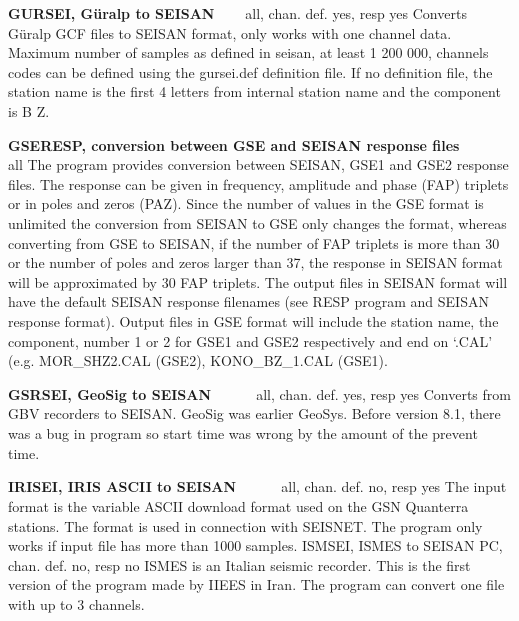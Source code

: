 \textbf{GURSEI, G\"uralp to SEISAN} \verb|   | all, chan. def. yes, resp yes\newline
Converts G\"uralp GCF files to SEISAN format, only works with one channel data. Maximum number of samples as defined in seisan, at least 1 200 000, channels codes can be defined using the gursei.def 
definition file. If no definition file, the station name is the first 4 letters from internal station name and the component is B Z. 

\textbf{GSERESP, conversion between GSE and SEISAN response files} \verb|     | all \newline
The program provides conversion between SEISAN, GSE1 and GSE2 response files. The response can be given in frequency, amplitude and phase (FAP) triplets or in poles and zeros (PAZ). Since the number of values in the GSE format is unlimited the conversion from SEISAN to GSE only changes the format, whereas converting from GSE to SEISAN, if the number of FAP triplets is more than 30 or the number of poles and zeros larger than 37, the response in SEISAN format will be approximated by 30 FAP triplets. The output files in SEISAN format will have the default SEISAN response filenames (see RESP program and SEISAN response format). Output files in GSE format will include the station name, the component, number 1 or 2 for GSE1 and GSE2 respectively and end on `.CAL' (e.g. MOR\_SHZ2.CAL (GSE2), KONO\_BZ\_1.CAL (GSE1). 

\textbf{GSRSEI, GeoSig to SEISAN} \verb|     | all, chan. def. yes, resp yes\newline
{}
Converts from GBV recorders to SEISAN. GeoSig was earlier GeoSys. Before version 8.1, there was a bug in program so start time was wrong by the amount of the prevent time. 

\textbf{IRISEI, IRIS ASCII to SEISAN} \verb|     | all, chan. def. no, resp yes \newline
{}
The input format is the variable ASCII download format used on the GSN Quanterra stations. The format is used in connection with SEISNET. The program only works if input file has more than 1000 samples. ISMSEI, ISMES to SEISAN PC, chan. def. no, resp no ISMES is an Italian seismic recorder. This is the first version of the program made by IIEES in Iran. The program can convert one file with up to 3 channels. 

